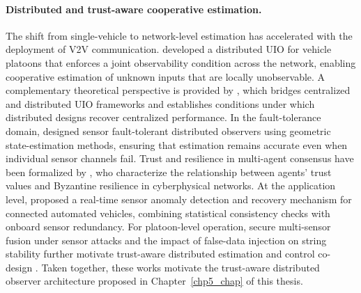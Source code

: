 \paragraph{Distributed and trust-aware cooperative estimation.}
The shift from single-vehicle to network-level estimation has accelerated with the deployment of V2V communication.
\cite{zhao2025distributedunknowninputobserver} developed a distributed UIO for vehicle platoons that enforces a joint observability condition across the network, enabling cooperative estimation of unknown inputs that are locally unobservable.
A complementary theoretical perspective is provided by \cite{zhao2025bridgingcentralizeddistributedframeworks}, which bridges centralized and distributed UIO frameworks and establishes conditions under which distributed designs recover centralized performance.
In the fault-tolerance domain, \cite{Guitao_multi_mesure} designed sensor fault-tolerant distributed observers using geometric state-estimation methods, ensuring that estimation remains accurate even when individual sensor channels fail.
Trust and resilience in multi-agent consensus have been formalized by \cite{trust_physic_connecte}, who characterize the relationship between agents' trust values and Byzantine resilience in cyberphysical networks.
At the application level, \cite{Wang_2021} proposed a real-time sensor anomaly detection and recovery mechanism for connected automated vehicles, combining statistical consistency checks with onboard sensor redundancy.
For platoon-level operation, secure multi-sensor fusion under sensor attacks and the impact of false-data injection on string stability further motivate trust-aware distributed estimation and control co-design \cite{YangLv2022SecureSensorFusion,Biroon2022FDICACCPlatoon}.
Taken together, these works motivate the trust-aware distributed observer architecture proposed in Chapter~\ref{chp5_chap} of this thesis.

